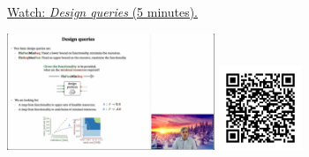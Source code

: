 
\begin{minipage}{10cm}
    \href{https://act4e-spring21.netlify.app/videos/spring2021-functorial-comp-a:design-queries.html}{Watch: \emph{Design queries} (5 minutes).}
        
    \href{https://act4e-spring21.netlify.app/videos/spring2021-functorial-comp-a:design-queries.html}{\includegraphics[height=3.5cm]{spring2021-functorial-comp-a:design-queries/thumbnails.jpg}}
    \href{https://act4e-spring21.netlify.app/videos/spring2021-functorial-comp-a:design-queries.html}{\includegraphics[height=2.5cm]{spring2021-functorial-comp-a:design-queries/qrcode.png}}
\end{minipage}
